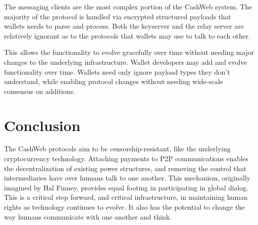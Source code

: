 \documentclass{article}
\theoremstyle{definition}
\begin{document}
The messaging clients are the most complex portion of the CashWeb system. The majority of the protocol is handled via encrypted structured payloads that wallets needs to parse and process. Both the keyserver and the relay server are relatively ignorant as to the protocols that wallets may use to talk to each other.

This allows the functionality to evolve gracefully over time without needing major changes to the underlying infrastructure. Wallet developers may add and evolve functionality over time. Wallets need only ignore payload types they don't understand, while enabling protocol changes without needing wide-scale consensus on additions.

\section{Conclusion}
The CashWeb protocols aim to be censorship-resistant, like the underlying cryptocurrency technology. Attaching payments to P2P communications enables the decentralization of existing power structures, and removing the control that intermediaries have over humans talk to one another. This mechanism, originally imagined by Hal Finney\cite{finney2004rpow}, provides equal footing in participating in global dialog. This is a critical step forward, and critical infrastructure, in maintaining human rights as technology continues to evolve. It also has the potential to change the way humans communicate with one another and think.

\cite{nakamoto2008bpp}




\end{document}
